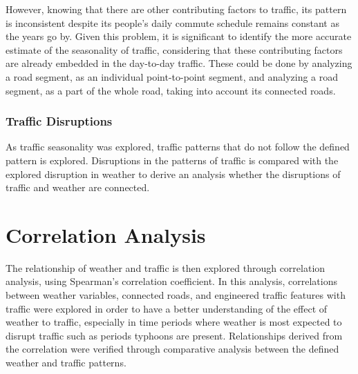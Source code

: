However, knowing that there are other contributing factors to traffic, its pattern is inconsistent despite its people’s daily commute schedule remains constant as the years go by. Given this problem, it is significant to identify the more accurate estimate of the seasonality of traffic, considering that these contributing factors are already embedded in the day-to-day traffic. These could be done by analyzing a road segment, as an individual point-to-point segment, and analyzing a road segment, as a part of the whole road, taking into account its connected roads.

\subsubsection{Traffic Disruptions}
As traffic seasonality was explored, traffic patterns that do not follow the defined pattern is explored. Disruptions in the patterns of traffic is compared with the explored disruption in weather to derive an analysis whether the disruptions of traffic and weather are connected.

\section{Correlation Analysis}
The relationship of weather and traffic is then explored through correlation analysis, using Spearman’s  correlation coefficient. In this analysis, correlations between weather variables, connected roads, and engineered traffic features with traffic were explored in order to have a better understanding of the effect of weather to traffic, especially in time periods where weather is most expected to disrupt traffic such as periods typhoons are present. Relationships derived from the correlation were verified through comparative analysis between the defined weather and traffic patterns.

